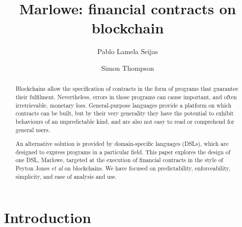 \documentclass[runningheads]{llncs}
\begin{document}
%
%
\title {Marlowe: financial contracts on blockchain}
%
%
\author{Pablo Lamela Seijas\\
\and Simon Thompson}
%
%


\begin{abstract}

Blockchains allow the specification of contracts in the form of programs that guarantee their fulfilment. 
Nevertheless, errors in those programs can cause important, and often irretrievable, monetary loss. General-purpose 
languages provide a platform on which contracts can be built, but by their very generality they have the potential to 
exhibit behaviours of an unpredictable kind, and are also not easy to read or comprehend for general users. 

An alternative solution is provided by domain-specific languages (DSLs), which are designed to express programs in a 
particular field. This paper explores the design of one DSL, Marlowe, targeted at the execution of financial 
contracts in the style of Peyton Jones \emph{et al} on blockchains. We have focused on predictability, enforceability, 
simplicity, and ease of analysis and use.

\end{abstract}



%
%


\maketitle


\section{Introduction}
\end{document}
